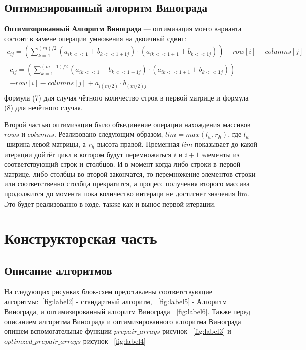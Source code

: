 \documentclass[14pt]{article}
\begin{document}
	\subsection{Оптимизированный алгоритм Винограда}
	\textbf{Оптимизированный Алгоритм Винограда} --- оптимизация моего варианта состоит в замене операции умножения на двоичный сдвиг:
	\begin{gather}
		c_{ij} = (\sum_{k=1}^{(m)/2} (a_{ik<<1} + b_{k<<1 + 1j})\cdot (a_{ik<<1+1} + b_{k<<1j})) - row[i] - columns[j]\\
		\begin{gathered}
			c_{ij} = (\sum_{k=1}^{(m-1)/2} (a_{ik<<1} + b_{k<<1 + 1j})\cdot (a_{ik<<1+1} + b_{k<<1j}))\\
			- row[i] - columns[j] + a_{i(m/2)}\cdot b_{(m/2)j}
		\end{gathered}
	\end{gather}
	формула (7) для случая чётного количество строк в первой матрице и формула (8) для нечётного случая.
	
	Второй частью оптимизации было объединение операции нахождения массивов $rows$ и $columns$. Реализовано следующим образом, $lim=max(l_w, r_h)$, где $l_w$-ширина левой матрицы, а $r_h$-высота правой. Пременная $lim$ показывает до какой итерации дойтёт цикл в котором будут перемножаться $i$ и $i + 1$ элементы из соответствующий строк и столбцов. И в момент когда либо строки в первой матрице, либо столбцы во второй закончатся, то перемножение элементов строки или соответственно столбца прекратится, а процесс получения второго массива продолжится до момента пока количество интераци не достигнет значения lim. Это будет реализованно в коде, также как и вынос первой итерации.
	\newpage
	
	\section{Конструкторская часть}
	\subsection{Описание алгоритмов}
	На следующих рисунках блок-схем представлены соответствующие алгоритмы:~\ref{fig:label2} - стандартный алгоритм, ~\ref{fig:label5} - Алгоритм Винограда, и оптимизированный алгоритм Винограда ~\ref{fig:label6}. Также перед описанием алгоритма Винограда и оптимизированного алгоритма Винограда опишем вспомогательные функции $prepair\_arrays$ рисунок ~\ref{fig:label3} и $optimzed\_prepair\_arrays$ рисунок ~\ref{fig:label4}
	
\end{document}
